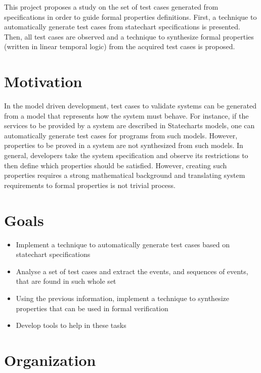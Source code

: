 This project proposes a study on the set of test cases generated from specifications in order to guide formal properties definitions. First, a technique to automatically generate test cases from statechart specifications is presented. Then, all test cases are observed and a technique to synthesize formal properties (written in linear temporal logic\cite{Hauth,wikiLTL}) from the acquired test cases is proposed. 

\section{Motivation}

In the model driven development, test cases to validate systems can be generated from a model that represents how the system must behave. For instance, if the services to be provided by a system are described in Statecharts models, one can  automatically generate test cases for programs from such models. However, properties to be proved in a system are not synthesized from such models. In general, developers take the system specification and observe its restrictions to then define which properties should be satisfied. However, creating such properties requires a strong mathematical background and translating system requirements to formal properties is not trivial process\cite{Prospec}.

\section{Goals}

\begin{itemize}

\item Implement a technique to automatically generate test cases based on statechart specifications

\item Analyse a set of test cases and extract the events, and sequences of events, that are found in such whole set

\item Using the previous information, implement a technique to synthesize properties that can be used in formal verification 

\item Develop tools to help in these tasks

\end{itemize}

\section{Organization}

